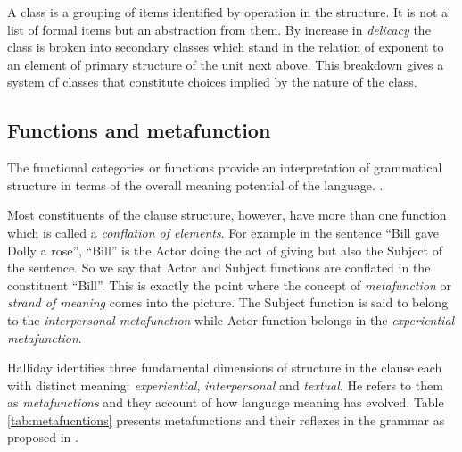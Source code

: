 A class is a grouping of items identified by operation in the structure. It is not a list of formal items but an abstraction from them. By increase in \textit{delicacy} the class is broken into secondary classes which stand in the relation of exponent to an element of primary structure of the unit next above. This breakdown gives a system of classes that constitute choices implied by the nature of the class. \citep[p.41]{Halliday2002}

\subsection{Functions and metafunction}
\begin{definition}[Function]\label{def:function}
	The functional categories or functions provide an interpretation of grammatical structure in terms of the overall meaning potential of the language. \citep[p.76]{Halliday2013}.
\end{definition}

Most constituents of the clause structure, however, have more than one function which is called a \textit{conflation of elements}. For example in the sentence ``Bill gave Dolly a rose'', ``Bill'' is the Actor doing the act of giving but also the Subject of the sentence. So we say that Actor and Subject functions are conflated in the constituent ``Bill''. This is exactly the point where the concept of \textit{metafunction} or \textit{strand of meaning} comes into the picture. The Subject function is said to belong to the \textit{interpersonal metafunction} while Actor function belongs in the \textit{experiential metafunction}. 

Halliday identifies three fundamental dimensions of structure in the clause each with distinct meaning: \textit{experiential}, \textit{interpersonal} and \textit{textual}. He refers to them as \textit{metafunctions} and they account of how language meaning has evolved. Table \ref{tab:metafucntions} presents metafunctions and their reflexes in the grammar as proposed in \citep[p.85]{Halliday2013}.

